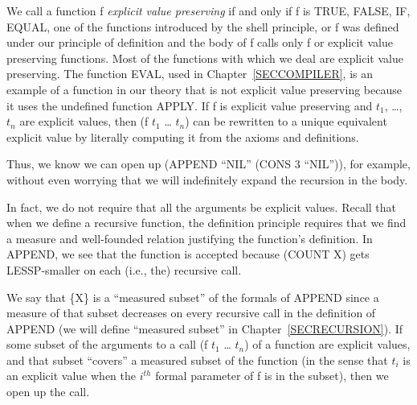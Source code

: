 \documentclass[11pt]{book}
\newcommand{\pubinlineunderline}[1]{\emph{#1}}
\begin{document}
We call a function f \pubinlineunderline{explicit value preserving} if and only if f is
TRUE, FALSE, IF, EQUAL, one of the functions introduced by the
shell principle, or f was defined under our principle of definition
and the body of f calls only f or explicit value preserving functions.
Most of the functions with which we deal are explicit value preserving.
The function EVAL, used in Chapter~\ref{SECCOMPILER}, is an example of a
function in our theory that is not explicit value preserving because
it uses the undefined function APPLY.
If f is explicit value preserving and
$t_{1}$, \ldots{}, $t_{n}$ are explicit values, then
(f $t_{1}$ \ldots{} $t_{n}$) can be rewritten to a unique equivalent explicit value
by literally computing it from the axioms and definitions.

Thus, we know we can open up (APPEND ``NIL'' (CONS 3 ``NIL'')), for example,
without even worrying that we will indefinitely expand the recursion
in the body.

In fact, we do not require that all the arguments be explicit values.
 Recall that when we define a recursive function, the definition principle
requires that we find a measure and well-founded relation justifying the
function's definition.  In APPEND, we see that the function is accepted because
(COUNT X) gets LESSP-smaller on each (i.e., the) recursive call.

We say that \{X\} is a ``measured subset'' of the formals of APPEND
since a measure of that subset decreases on every recursive call in the definition
of APPEND (we will define ``measured subset'' in Chapter~\ref{SECRECURSION}).
If some subset of the arguments to a call (f $t_{1}$ \ldots{} $t_{n}$) of a function are
explicit values, and that subset ``covers'' a measured subset of the function
(in the sense that $t_{i}$ is an explicit value when the $i^{th}$ formal
parameter of f is in the subset),
then we open up the call.
\end{document}
